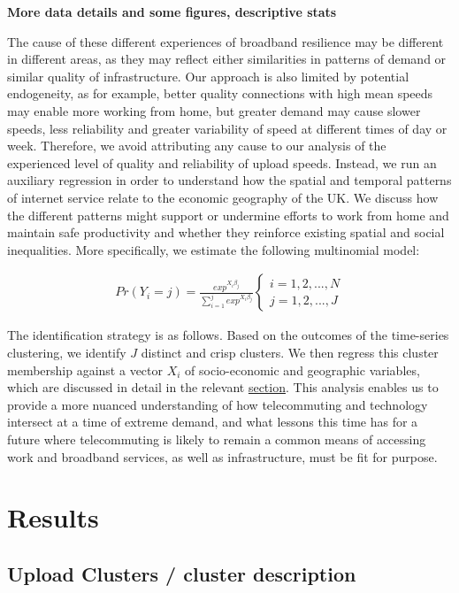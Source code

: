 \documentclass[]{interact}
\theoremstyle{plain}%
\theoremstyle{definition}
\theoremstyle{remark}
\begin{document}
\textbf{More data details and some figures, descriptive stats}

The cause of these different experiences of broadband resilience may be
different in different areas, as they may reflect either similarities in
patterns of demand or similar quality of infrastructure. Our approach is
also limited by potential endogeneity, as for example, better quality
connections with high mean speeds may enable more working from home, but
greater demand may cause slower speeds, less reliability and greater
variability of speed at different times of day or week. Therefore, we
avoid attributing any cause to our analysis of the experienced level of
quality and reliability of upload speeds. Instead, we run an auxiliary
regression in order to understand how the spatial and temporal patterns
of internet service relate to the economic geography of the UK. We
discuss how the different patterns might support or undermine efforts to
work from home and maintain safe productivity and whether they reinforce
existing spatial and social inequalities. More specifically, we estimate
the following multinomial model:

\begin{align}
Pr(Y_{i}=j) = \frac{exp^{X_{i}\beta_{j}}}{\sum_{i=1}^j exp^{X_{i}\beta_{j}}}
\begin{cases}
    i = 1, 2, ... , N \\  
    j = 1, 2, ... , J
\end{cases}\label{eq1}
\end{align}

The identification strategy is as follows. Based on the outcomes of the
time-series clustering, we identify \(J\) distinct and crisp clusters.
We then regress this cluster membership against a vector \(X_{i}\) of
socio-economic and geographic variables, which are discussed in detail
in the relevant \protect\hyperlink{sec:4.2}{section}. This analysis
enables us to provide a more nuanced understanding of how telecommuting
and technology intersect at a time of extreme demand, and what lessons
this time has for a future where telecommuting is likely to remain a
common means of accessing work and broadband services, as well as
infrastructure, must be fit for purpose.

\hypertarget{sec:4}{%
\section{Results}\label{sec:4}}

\hypertarget{sec:4.1}{%
\subsection{Upload Clusters / cluster description}\label{sec:4.1}}
\end{document}
